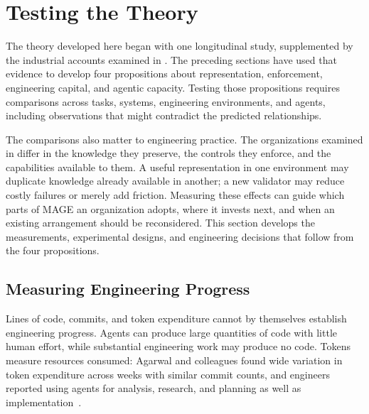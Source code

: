 


\chapter{Testing the Theory}


The theory developed here began with one longitudinal study, supplemented by the industrial accounts examined in . The preceding sections have used that evidence to develop four propositions about representation, enforcement, engineering capital, and agentic capacity. Testing those propositions requires comparisons across tasks, systems, engineering environments, and agents, including observations that might contradict the predicted relationships.

The comparisons also matter to engineering practice. The organizations examined in  differ in the knowledge they preserve, the controls they enforce, and the capabilities available to them. A useful representation in one environment may duplicate knowledge already available in another; a new validator may reduce costly failures or merely add friction. Measuring these effects can guide which parts of MAGE an organization adopts, where it invests next, and when an existing arrangement should be reconsidered. This section develops the measurements, experimental designs, and engineering decisions that follow from the four propositions.

\section{Measuring Engineering Progress}\label{heading:research-measuring-engineering-progress}

Lines of code, commits, and token expenditure cannot by themselves establish engineering progress. Agents can produce large quantities of code with little human effort, while substantial engineering work may produce no code. Tokens measure resources consumed: Agarwal and colleagues found wide variation in token expenditure across weeks with similar commit counts, and engineers reported using agents for analysis, research, and planning as well as implementation~\citep{agarwal2026tokens}.

